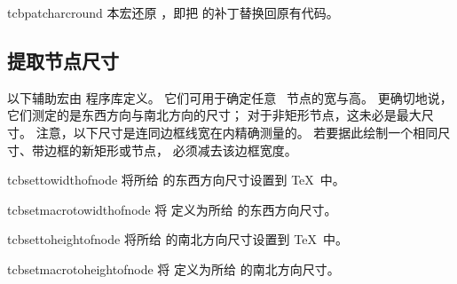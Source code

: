 \begin{docCommand}[doc new=2014-05-05]{tcbpatcharcround}{}
本宏还原 ，即把
 的补丁替换回原有代码。
\end{docCommand}


\clearpage
\subsection{提取节点尺寸}
以下辅助宏由  程序库定义。
它们可用于确定任意 \tikzname\ 节点的宽与高。
更确切地说，它们测定的是东西方向与南北方向的尺寸；
对于非矩形节点，这未必是最大尺寸。
注意，以下尺寸是连同边框线宽在内精确测量的。
若要据此绘制一个相同尺寸、带边框的新矩形或节点，
必须减去该边框宽度。

\begin{docCommand}[doc new=2014-09-19]{tcbsettowidthofnode}{}
  将所给 的东西方向尺寸设置到 \TeX\ 中。
\end{docCommand}

\begin{docCommand}[doc new=2014-09-19]{tcbsetmacrotowidthofnode}{}
  将 定义为所给 的东西方向尺寸。
\end{docCommand}

\begin{docCommand}[doc new=2014-09-19]{tcbsettoheightofnode}{}
  将所给 的南北方向尺寸设置到 \TeX\ 中。
\end{docCommand}

\begin{docCommand}[doc new=2014-09-19]{tcbsetmacrotoheightofnode}{}
  将 定义为所给 的南北方向尺寸。
\end{docCommand}

\begin{dispExample}
\end{dispExample}


